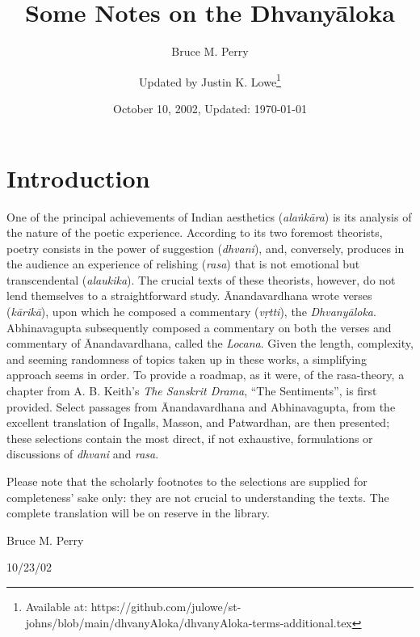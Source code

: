 \documentclass[10pt]{article}
\title{Some Notes on the Dhvanyāloka}
\author{Bruce M. Perry \and Updated by Justin K. Lowe\footnote{Available at: https://github.com/julowe/st-johns/blob/main/dhvanyAloka/dhvanyAloka-terms-additional.tex} }
\date{October 10, 2002, Updated: \today}
\begin{document}

\maketitle

\vspace{-8mm}
\section{Introduction}

 {\fontsize{10pt}{14pt}\selectfont
  One of the principal achievements of Indian aesthetics (\textit{alaṅkāra}) is its analysis of the nature of the poetic experience.
  According to its two foremost theorists, poetry consists in the power of suggestion (\textit{dhvani}), and, conversely, produces in the audience an experience of relishing (\textit{rasa}) that is not emotional but transcendental (\textit{alaukika}).
  The crucial texts of these theorists, however, do not lend themselves to a straightforward study.
  Ānandavardhana wrote verses (\textit{kārikā}), upon which he composed a commentary (\textit{vṛtti}), the \textit{Dhvanyāloka}.
  Abhinavagupta subsequently composed a commentary on both the verses and commentary of Ānandavardhana, called the \textit{Locana}.
  Given the length, complexity, and seeming randomness of topics taken up in these works, a simplifying approach seems in order.
  To provide a roadmap, as it were, of the rasa-theory, a chapter from A. B. Keith's \textit{The Sanskrit Drama}, ``The Sentiments'', is first provided.
  Select passages from Ānandavardhana and Abhinavagupta, from the excellent translation of Ingalls, Masson, and Patwardhan, are then presented; these selections contain the most direct, if not exhaustive, formulations or discussions of \textit{dhvani} and \textit{rasa}.

  Please note that the scholarly footnotes to the selections are supplied for completeness' sake only: they are not crucial to understanding the texts.
  The complete translation will be on reserve in the library.


  Bruce M. Perry

  10/23/02
 }



\end{document}
